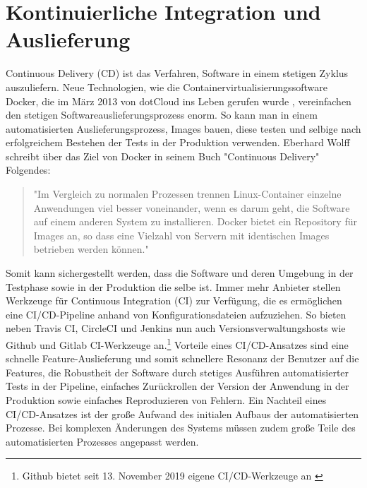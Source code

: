 \section{Kontinuierliche Integration und Auslieferung}
\label{sec:kontinuierlicheintegrationundauslieferung}
Continuous Delivery (CD) ist das Verfahren, Software in einem stetigen Zyklus auszuliefern.
Neue Technologien, wie die Containervirtualisierungssoftware Docker,
die im März 2013 von dotCloud ins Leben gerufen wurde \cite{DockerAbout2014}, vereinfachen
den stetigen Softwareauslieferungsprozess enorm. So kann man in einem automatisierten
Auslieferungsprozess, Images bauen, diese testen und selbige nach erfolgreichem
Bestehen der Tests in der Produktion verwenden. Eberhard Wolff schreibt über das Ziel von Docker in
seinem Buch "Continuous Delivery" Folgendes:

\begin{quote}
"Im Vergleich zu normalen Prozessen trennen Linux-Container
einzelne Anwendungen viel besser voneinander, wenn es darum geht, die Software auf einem anderen
System zu installieren. Docker bietet ein Repository für Images an, so dass eine Vielzahl
von Servern mit identischen Images betrieben werden können."\cite[S. 56]{ContinuousDeliveryWolff}
\end{quote}

Somit kann sichergestellt werden, dass die Software und deren Umgebung in der Testphase
sowie in der Produktion die selbe ist. Immer mehr Anbieter stellen Werkzeuge für Continuous Integration (CI) zur Verfügung,
die es ermöglichen eine CI/CD-Pipeline anhand von Konfigurationsdateien aufzuziehen. So bieten
neben Travis CI, CircleCI und Jenkins nun auch Versionsverwaltungshosts wie Github und
Gitlab CI-Werkzeuge an.\footnote{Github bietet seit 13. November 2019 eigene CI/CD-Werkzeuge an \cite{GithubCIToolsHeise}}
Vorteile eines CI/CD-Ansatzes sind eine schnelle Feature-Auslieferung und somit schnellere Resonanz der Benutzer auf die Features,
die Robustheit der Software durch stetiges Ausführen automatisierter Tests in der Pipeline, einfaches Zurückrollen
der Version der Anwendung in der Produktion sowie einfaches Reproduzieren von Fehlern. Ein Nachteil eines CI/CD-Ansatzes ist
der große Aufwand des initialen Aufbaus der automatisierten Prozesse. Bei komplexen Änderungen des Systems müssen zudem
große Teile des automatisierten Prozesses angepasst werden.
